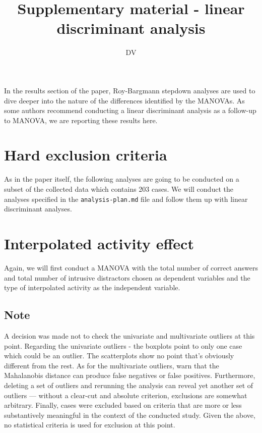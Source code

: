 \documentclass[11pt,]{article}
\title{Supplementary material - linear discriminant analysis}
\author{DV}
\date{}
\begin{document}
\maketitle

{
\setcounter{tocdepth}{4}
\tableofcontents
}
In the results section of the paper, Roy-Bargmann stepdown analyses are
used to dive deeper into the nature of the differences identified by the
MANOVAs. As some authors
\citep[eg.][]{tabachnickUsingMultivariateStatistics2012,salkindEncyclopediaMeasurementStatistics2007,
fieldDiscoveringStatisticsUsing2012} recommend conducting a linear
discriminant analysis as a follow-up to MANOVA, we are reporting these
results here.

\hypertarget{hard-exclusion-criteria}{%
\section{Hard exclusion criteria}\label{hard-exclusion-criteria}}

As in the paper itself, the following analyses are going to be conducted
on a subset of the collected data which contains 203 cases. We will
conduct the analyses specified in the \texttt{analysis-plan.md} file and
follow them up with linear discriminant analyses.

\hypertarget{interpolated-activity-effect}{%
\section{Interpolated activity
effect}\label{interpolated-activity-effect}}

Again, we will first conduct a MANOVA with the total number of correct
answers and total number of intrusive distractors chosen as dependent
variables and the type of interpolated activity as the independent
variable.

\hypertarget{note}{%
\subsection{Note}\label{note}}

A decision was made not to check the univariate and multivariate
outliers at this point. Regarding the univariate outliers - the boxplots
point to only one case which could be an outlier. The scatterplots show
no point that's obviously different from the rest. As for the
multivariate outliers, \citet{tabachnickUsingMultivariateStatistics2012}
warn that the Mahalanobis distance can produce false negatives or false
positives. Furthermore, deleting a set of outliers and rerunning the
analysis can reveal yet another set of outliers --- without a clear-cut
and absolute criterion, exclusions are somewhat arbitrary. Finally,
cases were excluded based on criteria that are more or less
substantively meaningful in the context of the conducted study. Given
the above, no statistical criteria is used for exclusion at this point.
\end{document}
